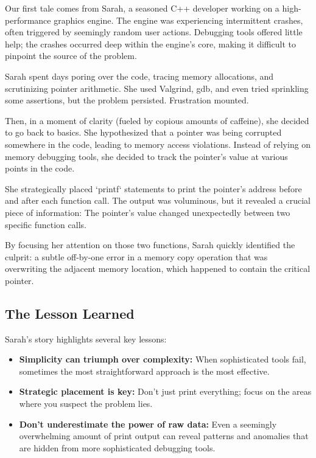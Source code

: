 \documentclass{article}
\begin{document}
Our first tale comes from Sarah, a seasoned C++ developer working on a high-performance graphics engine. The engine was experiencing intermittent crashes, often triggered by seemingly random user actions. Debugging tools offered little help; the crashes occurred deep within the engine's core, making it difficult to pinpoint the source of the problem.

Sarah spent days poring over the code, tracing memory allocations, and scrutinizing pointer arithmetic. She used Valgrind, gdb, and even tried sprinkling some assertions, but the problem persisted. Frustration mounted.

Then, in a moment of clarity (fueled by copious amounts of caffeine), she decided to go back to basics. She hypothesized that a pointer was being corrupted somewhere in the code, leading to memory access violations. Instead of relying on memory debugging tools, she decided to track the pointer's value at various points in the code.

She strategically placed `printf` statements to print the pointer's address before and after each function call. The output was voluminous, but it revealed a crucial piece of information: The pointer's value changed unexpectedly between two specific function calls.

By focusing her attention on those two functions, Sarah quickly identified the culprit: a subtle off-by-one error in a memory copy operation that was overwriting the adjacent memory location, which happened to contain the critical pointer.

\subsection*{The Lesson Learned}

Sarah's story highlights several key lessons:

\begin{itemize}
    \item \textbf{Simplicity can triumph over complexity:} When sophisticated tools fail, sometimes the most straightforward approach is the most effective.
    \item \textbf{Strategic placement is key:} Don't just print everything; focus on the areas where you suspect the problem lies.
    \item \textbf{Don't underestimate the power of raw data:} Even a seemingly overwhelming amount of print output can reveal patterns and anomalies that are hidden from more sophisticated debugging tools.
\end{itemize}
\end{document}
